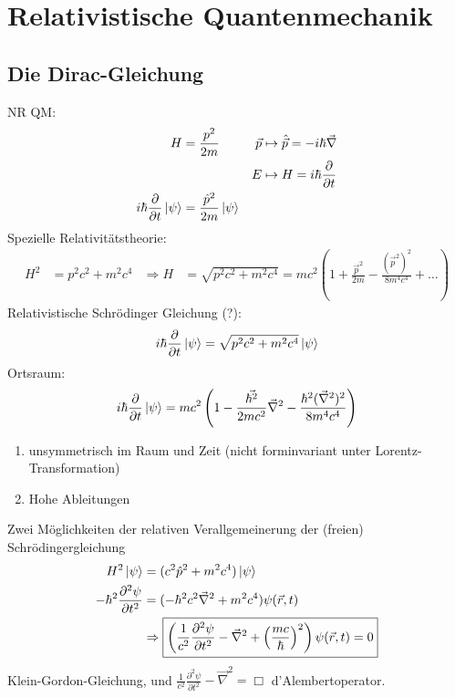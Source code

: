 \section{Relativistische Quantenmechanik}
\subsection{Die Dirac-Gleichung}
NR QM:
	\begin{align*}
		H &= \frac{p^2}{2m} 
		& \vec{p} &\mapsto \hat{\vec{p}} = -i \hbar \vec{\nabla} \\
		& & E &\mapsto H = i \hbar \frac{\partial}{\partial t} \\
		i \hbar \frac{\partial}{\partial t} \ket{\psi} 
		&= \frac{\hat{p}^2}{2m} \ket{\psi} 
	\end{align*}
Spezielle Relativitätstheorie:
	\begin{align*}
		H^2 &= p^2 c^2 + m^2 c^4 
		&\Rightarrow H &= \sqrt{p^2c^2 +m^2 c^4} 
		= mc^2\left(1 + \frac{\vec{p}^2}{2m} - \frac{(\vec{p}^2)^2}{8 m^4 c^4} + \ldots\right)
	\end{align*}
Relativistische Schrödinger Gleichung (?):
	\begin{align*}
		i \hbar \frac{\partial}{\partial t} \ket{\psi} 
		= \sqrt{p^2c^2 +m^2 c^4} \ket{\psi}
	\end{align*}
Ortsraum:
	\begin{align*}
		i \hbar \frac{\partial}{\partial t} \ket{\psi} 
		= mc^2 \left(1 - \frac{\vec{\hbar^2}}{2mc^2}\vec{\nabla}^2 - \frac{\hbar^2(\vec{\nabla}^2)^2}{8 m^4 c^4}\right)
	\end{align*}
	\begin{enumerate}
		\item unsymmetrisch im Raum und Zeit (nicht forminvariant unter Lorentz-Transformation)
		\item Hohe Ableitungen
	\end{enumerate}
Zwei Möglichkeiten der relativen Verallgemeinerung der (freien) Schrödingergleichung 
	\begin{align*}
		H^2 \ket{\psi} &= (c^2 \hat{p}^2 + m^2 c^4) \ket{\psi} \\
		-\hbar^2 \frac{\partial^2 \psi}{\partial t^2}
		&= (-\hbar^2 c^2 \vec{\nabla}^2 + m^2 c^4) \psi (\vec{r} , t) \\
		&\Rightarrow
		\boxed{
			\left(
			\frac{1}{c^2} \frac{\partial^2 \psi}{\partial t^2} - \vec{\nabla}^2 
			+ \left(\frac{mc}{\hbar}\right)^2
			\right)
			\psi (\vec{r} , t) = 0
		}
	\end{align*} 
Klein-Gordon-Gleichung, und $\frac{1}{c^2} \frac{\partial^2 \psi}{\partial t^2} - \vec{\nabla}^2 = \Box$ d'Alembertoperator.

